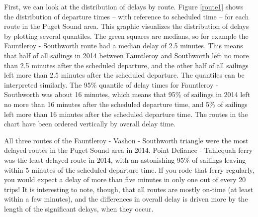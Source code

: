 \documentclass[11pt, letterpaper]{article}
\begin{document}
First, we can look at the distribution of delays by route. Figure \ref{route1} shows the distribution of departure times -- with reference to scheduled time -- for each route in the Puget Sound area. This graphic visualizes the distribution of delays by plotting several quantiles. The green squares are medians, so for example the Fauntleroy - Southworth route had a median delay of 2.5 minutes. This means that half of all sailings in 2014 between Fauntleroy and Southworth left no more than 2.5 minutes after the scheduled departure, and the other half of all sailings left more than 2.5 minutes after the scheduled departure. The quantiles can be interpreted similarly. The 95\% quantile of delay times for Fauntleroy - Southworth was about 16 minutes, which means that 95\% of sailings in 2014 left no more than 16 minutes after the scheduled departure time, and 5\% of sailings left more than 16 minutes after the scheduled departure time. The routes in the chart have been ordered vertically by overall delay time.


All three routes of the Fauntleroy - Vashon - Southworth triangle were the most delayed routes in the Puget Sound area in 2014. Point Defiance - Tahlequah ferry was the least delayed route in 2014, with an astonishing 95\% of sailings leaving within 5 minutes of the scheduled departure time. If you rode that ferry regularly, you would expect a delay of more than five minutes in only one out of every 20 trips! It is interesting to note, though, that all routes are mostly on-time (at least within a few minutes), and the differences in overall delay is driven more by the length of the significant delays, when they occur.
\end{document}
